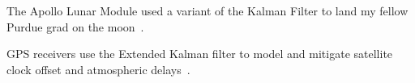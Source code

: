 \documentclass[aspectratio=169,19pt,xetex,handout]{beamer}
\begin{document}

\begin{frame}[t]{}

\vspace{-24pt}
\begin{block}{}
\Large
The Apollo Lunar Module used a variant of the Kalman Filter to land my fellow Purdue grad on the moon~\cite{Hal66,Hoa69,Bat70}.
\end{block}


\end{frame}


\begin{frame}[b]{}

\begin{block}{}
\Large
GPS receivers use the Extended Kalman filter to model and mitigate satellite clock offset and atmospheric delays~\cite{Axe95,Hof01}.
\end{block}

\end{frame}
\end{document}
